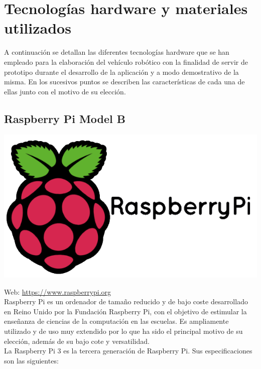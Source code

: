 \section{Tecnologías hardware y materiales utilizados}
\label{sec:tecnologias-hardware}

A continuación se detallan las diferentes tecnologías hardware que se han
empleado para la elaboración del vehículo robótico con la finalidad de servir de prototipo durante el desarrollo de la aplicación y a modo demostrativo de la misma. En los sucesivos puntos
se describen las características de cada una de ellas junto con el motivo de su elección.


\subsection{Raspberry Pi Model B}
\label{sec:raspberry}


\begin{center}
\includegraphics[scale=0.3]{imagenes/RaspberryPi-logo.png}
\end{center}

Web: \url{https://www.raspberrypi.org}\\

Raspberry Pi es un ordenador de tamaño reducido y de bajo coste desarrollado en Reino Unido por la Fundación Raspberry Pi, con el objetivo de estimular la enseñanza de ciencias de la computación
en las escuelas. Es ampliamente utilizado y de uso muy extendido por lo que ha sido el principal motivo de su elección, además de su bajo cote y versatilidad.\\

La Raspberry Pi 3 es la tercera generación de Raspberry Pi. Sus especificaciones son las siguientes:

